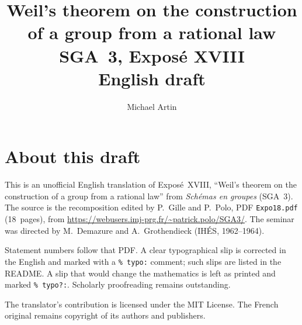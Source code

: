 \documentclass[11pt,a4paper,oneside]{amsbook}
\title[SGA~3, Expos\'e XVIII (English draft)]{Weil's theorem on the construction of a group from a rational law\\
{\normalsize SGA~3, Expos\'e XVIII\\English draft}}
\author{Michael Artin}
\date{}
\begin{document}
\frontmatter
\maketitle

\chapter*{About this draft}
This is an unofficial English translation of Expos\'e~XVIII, ``Weil's theorem on the construction of a group from a rational law''
from \textit{Sch\'emas en groupes} (SGA~3).
The source is the recomposition edited by P.~Gille and P.~Polo,
PDF \texttt{Expo18.pdf} (18~pages),
from \url{https://webusers.imj-prg.fr/~patrick.polo/SGA3/}.
The seminar was directed by M.~Demazure and A.~Grothendieck
(IH\'ES, 1962--1964).

Statement numbers follow that PDF. A clear typographical slip is
corrected in the English and marked with a \texttt{\% typo:} comment;
such slips are listed in the README. A slip that would change the
mathematics is left as printed and marked \texttt{\% typo?:}.
Scholarly proofreading remains outstanding.

The translator's contribution is licensed under the MIT License.
The French original remains copyright of its authors and publishers.

\tableofcontents
\mainmatter



\end{document}
